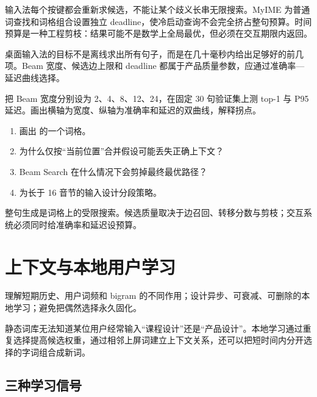 输入法每个按键都会重新求候选，不能让某个歧义长串无限搜索。MyIME 为普通词查找和词格组合设置独立 deadline，使冷启动查询不会完全挤占整句预算。时间预算是一种工程剪枝：结果可能不是数学上全局最优，但必须在交互期限内返回。

\begin{concept}[正确性与实时性的交换]
桌面输入法的目标不是离线求出所有句子，而是在几十毫秒内给出足够好的前几项。Beam 宽度、候选边上限和 deadline 都属于产品质量参数，应通过准确率—延迟曲线选择。
\end{concept}

\begin{lab}
把 Beam 宽度分别设为 2、4、8、12、24，在固定 30 句验证集上测 top-1 与 P95 延迟。画出横轴为宽度、纵轴为准确率和延迟的双曲线，解释拐点。
\end{lab}

\exercises
\begin{enumerate}
  \item 画出  的一个词格。
  \item 为什么仅按“当前位置”合并假设可能丢失正确上下文？
  \item Beam Search 在什么情况下会剪掉最终最优路径？
  \item 为长于 16 音节的输入设计分段策略。
\end{enumerate}

\begin{summarybox}
整句生成是词格上的受限搜索。候选质量取决于边召回、转移分数与剪枝；交互系统必须同时给准确率和延迟设预算。
\end{summarybox}


\chapter{上下文与本地用户学习}

\begin{goals}
理解短期历史、用户词频和 bigram 的不同作用；设计异步、可衰减、可删除的本地学习；避免把偶然选择永久固化。
\end{goals}

静态词库无法知道某位用户经常输入“课程设计”还是“产品设计”。本地学习通过重复选择提高候选权重，通过相邻上屏词建立上下文关系，还可以把短时间内分开选择的字词组合成新词。


\section{三种学习信号}


